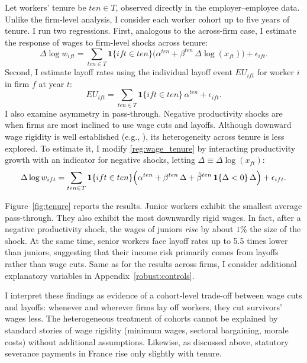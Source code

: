 Let workers’ tenure be $ten \in T$, observed directly in the employer–employee data. Unlike the firm-level analysis, I consider each worker cohort up to five years of tenure. I run two regressions. First, analogous to the across-firm case, I estimate the response of wages to firm-level shocks across tenure:
\begin{equation}\label{reg:wage_tenure}
\Delta \log w_{ift} = \sum_{ten \in T} \mathbf{1}\{ift \in ten\}\bigl(\alpha^{ten} + \beta^{ten}\,\Delta \log(x_{ft})\bigr) + \epsilon_{ift}.
\end{equation}
Second, I estimate layoff rates using the individual layoff event $EU_{ift}$ for worker $i$ in firm $f$ at year $t$:
\[
EU_{ift} = \sum_{ten \in T} \mathbf{1}\{ift \in ten\}\,\alpha^{ten} + \epsilon_{ift}.
\]
I also examine asymmetry in pass-through. Negative productivity shocks are when firms are most inclined to use wage cuts and layoffs. Although downward wage rigidity is well established (e.g., \textcite{hazell2021}), its heterogeneity across tenure is less explored. To estimate it, I modify \eqref{reg:wage_tenure} by interacting productivity growth with an indicator for negative shocks, letting $\Delta \equiv \Delta \log(x_{ft})$:
\[
\Delta \log w_{ift} = \sum_{ten \in T} \mathbf{1}\{ift \in ten\}\Bigl(\alpha^{ten} + \beta^{ten}\,\Delta + \tilde{\beta}^{ten}\,\mathbf{1}\{\Delta < 0\}\,\Delta\Bigr) + \epsilon_{ift}.
\]

Figure~\ref{fig:tenure} reports the results. Junior workers exhibit the smallest average pass-through. They also exhibit the most downwardly rigid wages. In fact, after a negative productivity shock, the wages of juniors \emph{rise} by about $1\%$ the size of the shock. At the same time, senior workers face layoff rates up to 5.5 times lower than juniors, suggesting that their income risk primarily comes from layoffs rather than wage cuts. Same as for the results across firms, I consider additional explanatory variables in Appendix~\ref{robust:controls}.

I interpret these findings as evidence of a cohort-level trade-off between wage cuts and layoffs: whenever and wherever firms lay off workers, they cut survivors’ wages less. The heterogeneous treatment of cohorts cannot be explained by standard stories of wage rigidity (minimum wages, sectoral bargaining, morale costs) without additional assumptions. Likewise, as discussed above, statutory severance payments in France rise only slightly with tenure.

